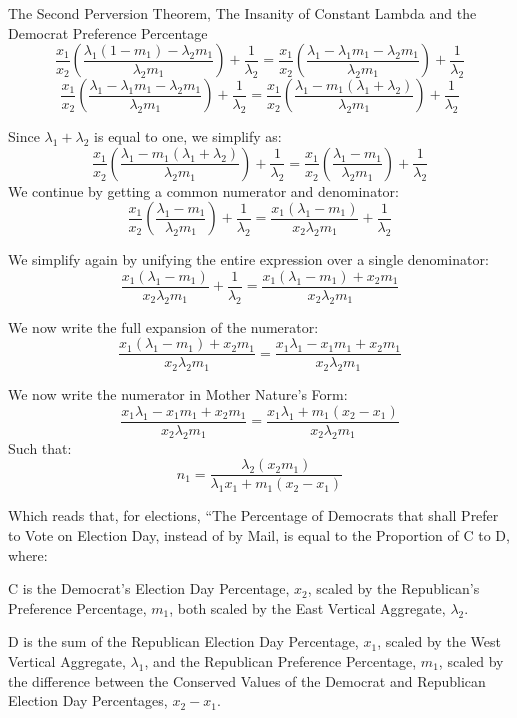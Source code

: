 \begin{theorem}{The Second Perversion Theorem, The Insanity of Constant Lambda and the Democrat Preference Percentage}
$$\frac{x_{1}}{x_{2}}\left(\frac{\lambda_{1}(1-m_{1})-\lambda_{2}m_{1}}{\lambda_{2}m_{1}} \right)+\frac{1}{\lambda_{2}}=\frac{x_{1}}{x_{2}}\left(\frac{\lambda_{1}-\lambda_{1}m_{1}-\lambda_{2}m_{1}}{\lambda_{2}m_{1}} \right)+\frac{1}{\lambda_{2}}$$
$$\frac{x_{1}}{x_{2}}\left(\frac{\lambda_{1}-\lambda_{1}m_{1}-\lambda_{2}m_{1}}{\lambda_{2}m_{1}} \right)+\frac{1}{\lambda_{2}}=\frac{x_{1}}{x_{2}}\left(\frac{\lambda_{1}-m_{1}(\lambda_{1}+\lambda_{2})}{\lambda_{2}m_{1}} \right)+\frac{1}{\lambda_{2}}$$

Since $\lambda_{1}+\lambda_{2}$ is equal to one, we simplify as:
$$\frac{x_{1}}{x_{2}}\left(\frac{\lambda_{1}-m_{1}(\lambda_{1}+\lambda_{2})}{\lambda_{2}m_{1}} \right)+\frac{1}{\lambda_{2}}=\frac{x_{1}}{x_{2}}\left(\frac{\lambda_{1}-m_{1}}{\lambda_{2}m_{1}} \right)+\frac{1}{\lambda_{2}}$$
\newpage
We continue by getting a common numerator and denominator:
$$\frac{x_{1}}{x_{2}}\left(\frac{\lambda_{1}-m_{1}}{\lambda_{2}m_{1}} \right)+\frac{1}{\lambda_{2}}=\frac{x_{1}(\lambda_{1}-m_{1})}{x_{2}\lambda_{2}m_{1}}+\frac{1}{\lambda_{2}}$$

We simplify again by unifying the entire expression over a single denominator:
$$\frac{x_{1}(\lambda_{1}-m_{1})}{x_{2}\lambda_{2}m_{1}}+\frac{1}{\lambda_{2}}=\frac{x_{1}(\lambda_{1}-m_{1})+x_{2}m_{1}}{x_{2}\lambda_{2}m_{1}}$$

We now write the full expansion of the numerator:
$$\frac{x_{1}(\lambda_{1}-m_{1})+x_{2}m_{1}}{x_{2}\lambda_{2}m_{1}}=\frac{x_{1}\lambda_{1}-x_{1}m_{1}+x_{2}m_{1}}{x_{2}\lambda_{2}m_{1}}$$

We now write the numerator in Mother Nature's Form:
$$\frac{x_{1}\lambda_{1}-x_{1}m_{1}+x_{2}m_{1}}{x_{2}\lambda_{2}m_{1}}=\frac{x_{1}\lambda_{1}+m_{1}(x_{2}-x_{1})}{x_{2}\lambda_{2}m_{1}}$$
Such that:
$$n_{1}=\frac{\lambda_{2}(x_{2}m_{1})}{\lambda_{1}x_{1}+m_{1}(x_{2}-x_{1})}$$

Which reads that, for elections, ``The Percentage of Democrats that shall Prefer to Vote on Election Day, instead of by Mail, is equal to the Proportion of C to D, where:

C is the Democrat's Election Day Percentage, $x_{2}$, scaled by the Republican's Preference Percentage, $m_{1}$, both scaled by the East Vertical Aggregate, $\lambda_{2}$.

D is the sum of the Republican Election Day Percentage, $x_{1}$, scaled by the West Vertical Aggregate, $\lambda_{1}$, and the Republican Preference Percentage, $m_{1}$, scaled by the difference between the Conserved Values of the Democrat and Republican Election Day Percentages, $x_{2}-x_{1}$.


\end{theorem}
